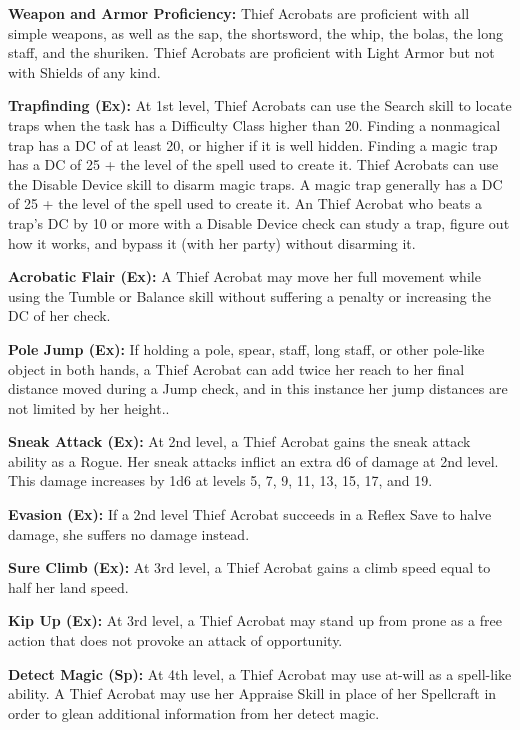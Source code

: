 \classfeatures

\textbf{Weapon and Armor Proficiency:} Thief Acrobats are proficient with all simple weapons, as well as the sap, the shortsword, the whip, the bolas, the long staff, and the shuriken. Thief Acrobats are proficient with Light Armor but not with Shields of any kind.

\textbf{Trapfinding (Ex):} At 1st level, Thief Acrobats can use the Search skill to locate traps when the task has a Difficulty Class higher than 20. Finding a nonmagical trap has a DC of at least 20, or higher if it is well hidden. Finding a magic trap has a DC of 25 + the level of the spell used to create it. Thief Acrobats can use the Disable Device skill to disarm magic traps. A magic trap generally has a DC of 25 + the level of the spell used to create it. An Thief Acrobat who beats a trap's DC by 10 or more with a Disable Device check can study a trap, figure out how it works, and bypass it (with her party) without disarming it.

\textbf{Acrobatic Flair (Ex):} A Thief Acrobat may move her full movement while using the Tumble or Balance skill without suffering a penalty or increasing the DC of her check.

\textbf{Pole Jump (Ex):} If holding a pole, spear, staff, long staff, or other pole-like object in both hands, a Thief Acrobat can add twice her reach to her final distance moved during a Jump check, and in this instance her jump distances are not limited by her height..

\textbf{Sneak Attack (Ex):} At 2nd level, a Thief Acrobat gains the sneak attack ability as a Rogue. Her sneak attacks inflict an extra d6 of damage at 2nd level. This damage increases by 1d6 at levels 5, 7, 9, 11, 13, 15, 17, and 19.

\textbf{Evasion (Ex):} If a 2nd level Thief Acrobat succeeds in a Reflex Save to halve damage, she suffers no damage instead.

\textbf{Sure Climb (Ex):} At 3rd level, a Thief Acrobat gains a climb speed equal to half her land speed.

\textbf{Kip Up (Ex):} At 3rd level, a Thief Acrobat may stand up from prone as a free action that does not provoke an attack of opportunity.

\textbf{Detect Magic (Sp):} At 4th level, a Thief Acrobat may use  at-will as a spell-like ability. A Thief Acrobat may use her Appraise Skill in place of her Spellcraft in order to glean additional information from her detect magic.

